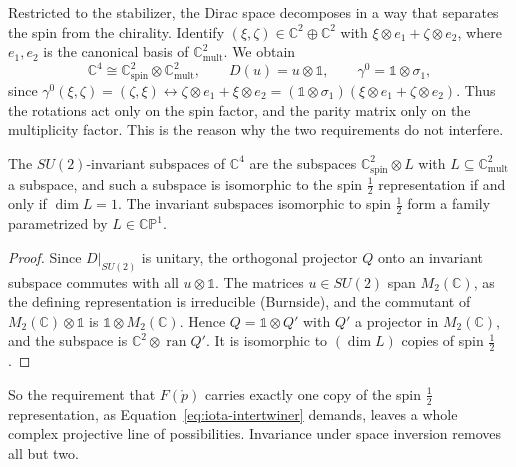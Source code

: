 	Restricted to the stabilizer, the Dirac space decomposes in a way that separates the spin from the chirality. Identify $(\xi,\zeta)\in\mathbb{C}^2\oplus\mathbb{C}^2$ with $\xi\otimes e_1+\zeta\otimes e_2$, where $e_1,e_2$ is the canonical basis of $\mathbb{C}^2_{\mathrm{mult}}$. We obtain
	\begin{equation*}
		\mathbb{C}^4\cong\mathbb{C}^2_{\mathrm{spin}}\otimes\mathbb{C}^2_{\mathrm{mult}}, \qquad D(u)=u\otimes\mathbb{1}, \qquad \gamma^0=\mathbb{1}\otimes\sigma_1,
	\end{equation*}
	since $\gamma^0(\xi,\zeta)=(\zeta,\xi)\leftrightarrow\zeta\otimes e_1+\xi\otimes e_2=(\mathbb{1}\otimes\sigma_1)(\xi\otimes e_1+\zeta\otimes e_2)$. Thus the rotations act only on the spin factor, and the parity matrix only on the multiplicity factor. This is the reason why the two requirements do not interfere.
	
	\begin{lemma}\label{lem:su2-subspaces}
		The $SU(2)$-invariant subspaces of $\mathbb{C}^4$ are the subspaces $\mathbb{C}^2_{\mathrm{spin}}\otimes L$ with $L\subseteq\mathbb{C}^2_{\mathrm{mult}}$ a subspace, and such a subspace is isomorphic to the spin $\frac12$ representation if and only if $\dim L=1$. The invariant subspaces isomorphic to spin $\frac12$ form a family parametrized by $L\in\mathbb{CP}^1$.
	\end{lemma}
	
	\begin{proof}
		Since $D|_{SU(2)}$ is unitary, the orthogonal projector $Q$ onto an invariant subspace commutes with all $u\otimes\mathbb{1}$. The matrices $u\in SU(2)$ span $M_2(\mathbb{C})$, as the defining representation is irreducible (Burnside), and the commutant of $M_2(\mathbb{C})\otimes\mathbb{1}$ is $\mathbb{1}\otimes M_2(\mathbb{C})$. Hence $Q=\mathbb{1}\otimes Q'$ with $Q'$ a projector in $M_2(\mathbb{C})$, and the subspace is $\mathbb{C}^2\otimes\operatorname{ran}Q'$. It is isomorphic to $(\dim L)$ copies of spin $\frac12$.
	\end{proof}
	
	So the requirement that $F(\mathring{p})$ carries exactly one copy of the spin $\frac12$ representation, as Equation~\eqref{eq:iota-intertwiner} demands, leaves a whole complex projective line of possibilities. Invariance under space inversion removes all but two.
	
